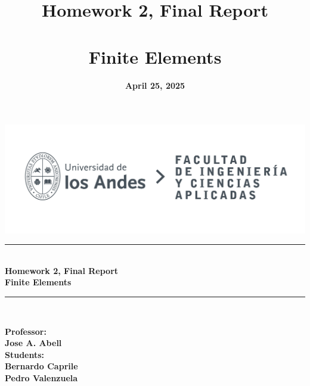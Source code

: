 \documentclass[12pt]{article}
\title{\textbf{Homework 2, Final Report\\ \vspace{0.5cm} \\ Finite Elements}}
\date{\textbf{April 25, 2025}}
\begin{document}
\makeatletter
\begin{titlepage}
    \begin{center}
        \vspace{2cm}
        \includegraphics[width=0.8\linewidth]{LOGO_UNIVERSIDAD.jpg}\\[10ex]
        
        \rule{\textwidth}{1pt} \\[2ex]
        {\LARGE \textbf{Homework 2, Final Report\\ \vspace{0.5cm} Finite Elements}}\\[2ex]
        \rule{\textwidth}{1pt} \\[10ex]

        \vfill

        \begin{flushright}
            \textbf{Professor:\\
             Jose A. Abell} \\[0.3cm]
            \textbf{Students: \\
            Bernardo Caprile\\
            Pedro Valenzuela} \\[0.3cm]
        \end{flushright}
        
        \vspace*{1cm}
        {\normalsize \@date}
    \end{center}
\end{titlepage}
\makeatother


\pagestyle{fancy}
\fancyhf{}
\rhead{\shorttitle}


\rfoot{\thepage}
\renewcommand{\footrulewidth}{0.5pt}

\tableofcontents
\end{document}
